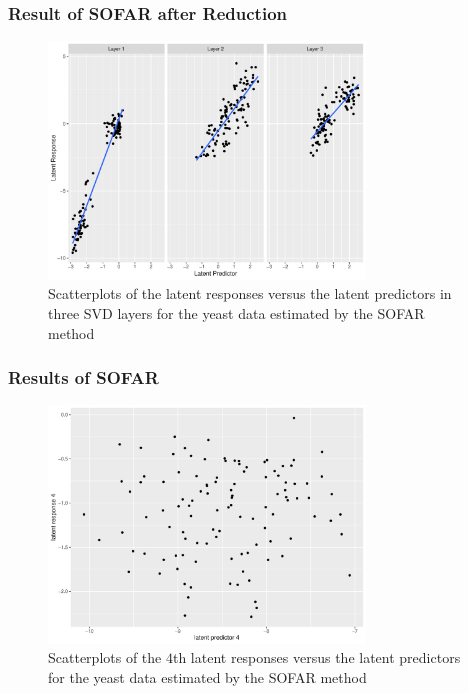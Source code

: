 \begin{frame}
    \frametitle{Result of SOFAR after Reduction}
    \begin{figure}[h]
        \centering
        \includegraphics[width=0.75\textwidth]{./figs/letent2.pdf}
        \caption{Scatterplots of the latent responses versus the latent predictors in three SVD layers for the yeast data estimated by the SOFAR method}
    \end{figure}
\end{frame}

\begin{frame} \frametitle{Results of SOFAR}
    \begin{figure}[h]
        \centering
        \includegraphics[width=0.75\textwidth]{./figs/latent4.pdf}
        \caption{Scatterplots of the $4$th latent responses versus the latent predictors for the yeast data estimated by the SOFAR method}
    \end{figure}
\end{frame}

